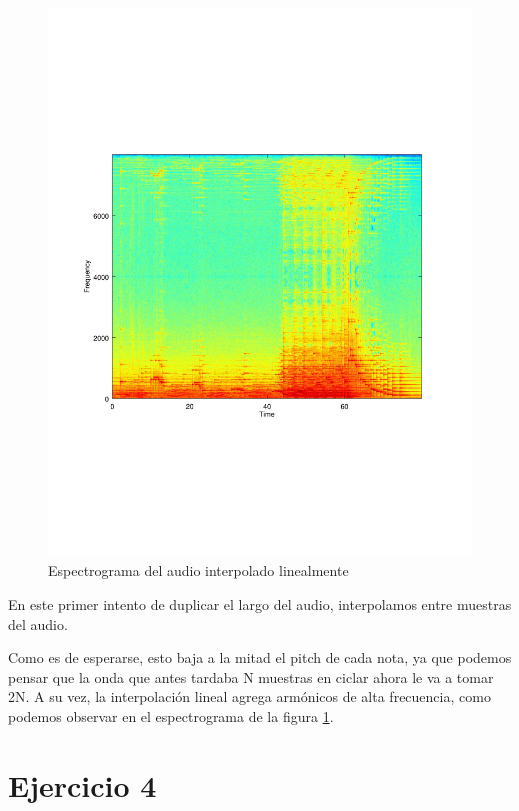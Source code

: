 \documentclass[paper=a4, fontsize=11pt]{scrartcl} %
\numberwithin{equation}{section} %
\numberwithin{figure}{section} %
\numberwithin{table}{section} %
\begin{document}
\begin{figure}[bh!]
\includegraphics[scale=1]{../images/specgram_3_interpolated.pdf}
\caption{Espectrograma del audio interpolado linealmente}
\label{audio_interp_lineal}
\end{figure}

En este primer intento de duplicar el largo del audio, interpolamos entre muestras del audio.

Como es de esperarse, esto baja a la mitad el pitch de cada nota, ya que podemos pensar que la onda que antes tardaba N muestras en ciclar ahora le va a tomar 2N. A su vez, la interpolación lineal agrega armónicos de alta frecuencia, como podemos observar en el espectrograma de la figura \ref{audio_interp_lineal}.

\newpage

\section{Ejercicio 4}
\end{document}
